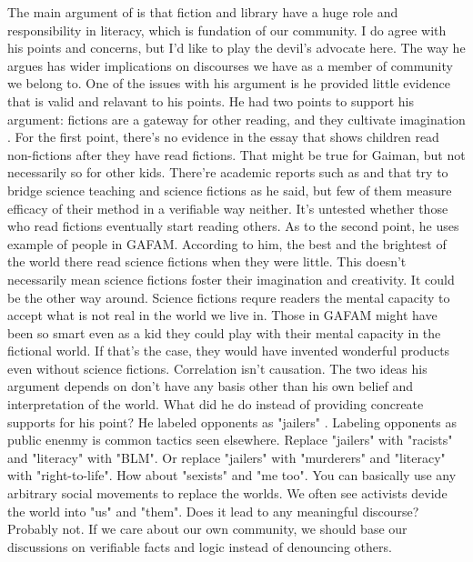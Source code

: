 \documentclass[10pt,a4paper]{article}
\begin{document}
  The main argument of \citet{DayDreamingGaiman} is that fiction and library have a huge role and responsibility in literacy, which is fundation of our community. I do agree with his points and concerns, but I'd like to play the devil's advocate here. The way he argues has wider implications on discourses we have as a member of community we belong to. 
  One of the issues with his argument is he provided little evidence that is valid and relavant to his points. He had two points to support his argument: fictions are a gateway for other reading, and they cultivate imagination \citep{DayDreamingGaiman}. For the first point, there's no evidence in the essay that shows children read non-fictions after they have read fictions. That might be true for Gaiman, but not necessarily so for other kids. There're academic reports such as \citet{EngenderingCox} and \citet{IncorporatingCzerneda} that try to bridge science teaching and science fictions as he said, but few of them measure efficacy of their method in a verifiable way neither. It's untested whether those who read fictions eventually start reading others. 
  As to the second point, he uses example of people in GAFAM. According to him, the best and the brightest of the world there read science fictions when they were little. This doesn't necessarily mean science fictions foster their imagination and creativity. It could be the other way around. Science fictions requre readers the mental capacity to accept what is not real in the world we live in. Those in GAFAM might have been so smart even as a kid they could play with their mental capacity in the fictional world. If that's the case, they would have invented wonderful products even without science fictions. Correlation isn't causation. The two ideas his argument depends on don't have any basis other than his own belief and interpretation of the world. 
  What did he do instead of providing concreate supports for his point? He labeled opponents as "jailers" \citep[23]{DayDreamingGaiman}. Labeling opponents as public enenmy is common tactics seen elsewhere. Replace "jailers" with "racists" and "literacy" with "BLM". Or replace "jailers" with "murderers" and "literacy" with "right-to-life". How about "sexists" and "me too". You can basically use any arbitrary social movements to replace the worlds. We often see activists devide the world into "us" and "them". Does it lead to any meaningful discourse? Probably not. If we care about our own community, we should base our discussions on verifiable facts and logic instead of denouncing others. 


\end{document}
